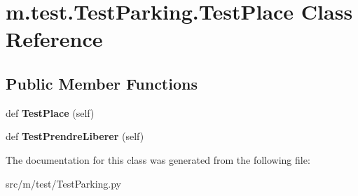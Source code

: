 \hypertarget{classm_1_1test_1_1_test_parking_1_1_test_place}{}\section{m.\+test.\+Test\+Parking.\+Test\+Place Class Reference}
\label{classm_1_1test_1_1_test_parking_1_1_test_place}
\subsection*{Public Member Functions}
\begin{DoxyCompactItemize}
\item 
\hypertarget{classm_1_1test_1_1_test_parking_1_1_test_place_a283e52b6858982f9ea19e6cbc49a80c4}{}def {\bfseries Test\+Place} (self)\label{classm_1_1test_1_1_test_parking_1_1_test_place_a283e52b6858982f9ea19e6cbc49a80c4}

\item 
\hypertarget{classm_1_1test_1_1_test_parking_1_1_test_place_ac592ec40836d277e81592ab294d8cf15}{}def {\bfseries Test\+Prendre\+Liberer} (self)\label{classm_1_1test_1_1_test_parking_1_1_test_place_ac592ec40836d277e81592ab294d8cf15}

\end{DoxyCompactItemize}


The documentation for this class was generated from the following file\+:\begin{DoxyCompactItemize}
\item 
src/m/test/Test\+Parking.\+py\end{DoxyCompactItemize}
